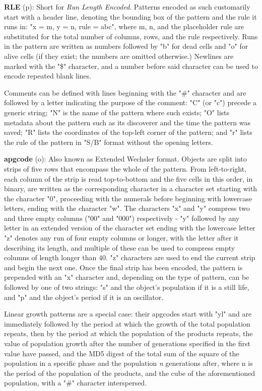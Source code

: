 \documentclass[
	11pt, %
	fleqn, %
	a4paper, %
]{LegrandOrangeBook}
\begin{document}
\textbf{RLE} (p): Short for \textit{Run Length Encoded}. Patterns encoded as such customarily start with a header line, denoting the bounding box of the pattern and the rule it runs in: "x = m, y = n, rule = abc", where m, n, and the placeholder rule are substituted for the total number of columns, rows, and the rule respectively. Runs in the pattern are written as numbers followed by "b" for dead cells and "o" for alive cells (if they exist; the numbers are omitted otherwise.) Newlines are marked with the "\$" character, and a number before said character can be used to encode repeated blank lines. 

Comments can be defined with lines beginning with the "\#" character and are followed by a letter indicating the purpose of the comment: "C" (or "c") precede a generic string; "N" is the name of the pattern where such exists; "O" lists metadata about the pattern such as its discoverer and the time the pattern was saved; "R" lists the coordinates of the top-left corner of the pattern; and "r" lists the rule of the pattern in "S/B" format without the opening letters. 

\textbf{apgcode} (o): Also known as Extended Wechsler format. Objects are split into strips of five rows that encompass the whole of the pattern. From left-to-right, each column of the strip is read top-to-bottom and the five cells in this order, in binary, are written as the corresponding character in a character set starting with the character "0", proceeding with the numerals before beginning with lowercase letters, ending with the character "w". The characters "x" and "y" compress two and three empty columns ("00" and "000") respectively -  "y" followed by any letter in an extended version of the character set ending with the lowercase letter "z" denotes any run of four empty columns or longer, with the letter after it describing its length, and multiple of these can be used to compress empty columns of length longer than 40. "z" characters are used to end the current strip and begin the next one. Once the final strip has been encoded, the pattern is prepended with an "x" character and, depending on the type of pattern, can be followed by one of two strings: "s" and the object's population if it is a still life, and "p" and the object's period if it is an oscillator.

Linear growth patterns are a special case: their apgcodes start with "yl" and are immediately followed by the period at which the growth of the total population repeats, then by the period at which the population of the products repeats, the value of population growth after the number of generations specified in the first value have passed, and the MD5 digest of the total sum of the square of the population in a specific phase and the population \textit{n} generations after, where n is the period of the population of the products, and the cube of the aforementioned population, with a "\#" character interspersed. 
\end{document}

